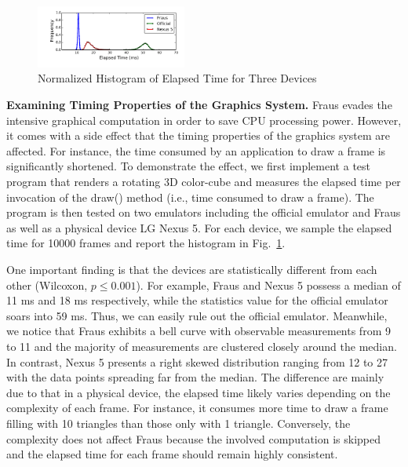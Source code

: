 \documentclass[conference]{IEEEtranl}
\begin{document}
	\begin{figure}[t]
	\begin{center}
	\includegraphics[width=0.44\textwidth]{Figures/elapse}
	\caption{Normalized Histogram of Elapsed Time for Three Devices}
	\label{fig:elapse}
	\vspace{-0.4in}
	\end{center}
	\end{figure}

	\textbf{Examining Timing Properties of the Graphics System.} 
	Fraus evades the intensive graphical computation in order to save CPU processing power. However, it comes with a side effect that the timing properties of the graphics system are affected. For instance, the time consumed by an application to draw a frame is significantly shortened.
	 To demonstrate the effect, we first implement a test program that renders a rotating 3D color-cube and measures the elapsed time per invocation of the draw() method (i.e., time consumed to draw a frame). The program is then tested on two emulators including the official emulator and Fraus as well as a physical device LG Nexus 5. For each device, we sample the elapsed time for 10000 frames and report the histogram in Fig.~\ref{fig:elapse}.

	One important finding is that the devices are statistically different from each other (Wilcoxon, $p \le 0.001$). For example, Fraus and Nexus 5 possess a median of 11 ms and 18 ms respectively, while the statistics value for the official emulator soars into 59 ms. Thus, we can easily rule out the official emulator. Meanwhile, we notice that Fraus exhibits a bell curve with observable measurements from 9 to 11 and the majority of measurements are clustered closely around the median. In contrast, Nexus 5 presents a right skewed distribution ranging from 12 to 27 with the data points spreading far from the median. The difference are mainly due to that in a physical device, the elapsed time likely varies depending on the complexity of each frame. For instance, it consumes more time to draw a frame filling with 10 triangles than those only with 1 triangle. Conversely, the complexity does not affect Fraus because the involved computation is skipped and the elapsed time for each frame should remain highly consistent. 
\end{document}
